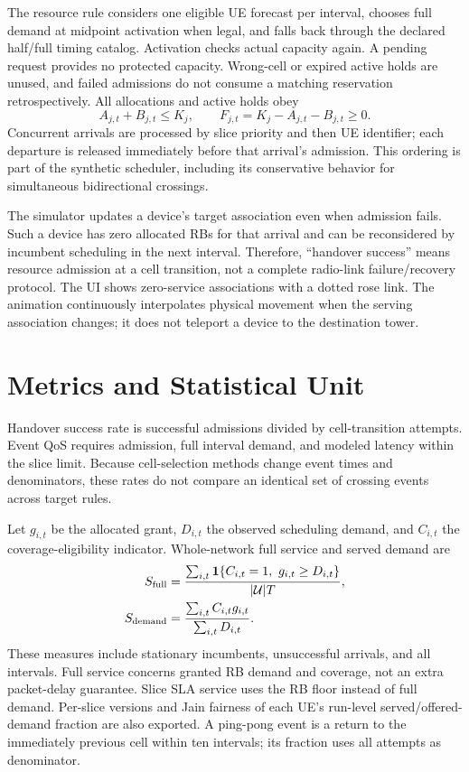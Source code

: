 \documentclass[journal]{IEEEtran}
\begin{document}
The resource rule considers one eligible UE forecast per interval, chooses full demand at midpoint activation when legal, and falls back through the declared half/full timing catalog. Activation checks actual capacity again. A pending request provides no protected capacity. Wrong-cell or expired active holds are unused, and failed admissions do not consume a matching reservation retrospectively. All allocations and active holds obey
\begin{equation}
A_{j,t}+B_{j,t}\le K_j,\qquad F_{j,t}=K_j-A_{j,t}-B_{j,t}\ge0.
\end{equation}
Concurrent arrivals are processed by slice priority and then UE identifier; each departure is released immediately before that arrival's admission. This ordering is part of the synthetic scheduler, including its conservative behavior for simultaneous bidirectional crossings.

The simulator updates a device's target association even when admission fails. Such a device has zero allocated RBs for that arrival and can be reconsidered by incumbent scheduling in the next interval. Therefore, ``handover success'' means resource admission at a cell transition, not a complete radio-link failure/recovery protocol. The UI shows zero-service associations with a dotted rose link. The animation continuously interpolates physical movement when the serving association changes; it does not teleport a device to the destination tower.

\section{Metrics and Statistical Unit}
Handover success rate is successful admissions divided by cell-transition attempts. Event QoS requires admission, full interval demand, and modeled latency within the slice limit. Because cell-selection methods change event times and denominators, these rates do not compare an identical set of crossing events across target rules.

Let $g_{i,t}$ be the allocated grant, $D_{i,t}$ the observed scheduling demand, and $C_{i,t}$ the coverage-eligibility indicator. Whole-network full service and served demand are
\begin{align}
S_{\rm full}&=\frac{\sum_{i,t}\mathbf1\{C_{i,t}=1,\ g_{i,t}\ge D_{i,t}\}}{|\mathcal U|T},\\
S_{\rm demand}&=\frac{\sum_{i,t}C_{i,t}g_{i,t}}{\sum_{i,t}D_{i,t}}.
\end{align}
These measures include stationary incumbents, unsuccessful arrivals, and all intervals. Full service concerns granted RB demand and coverage, not an extra packet-delay guarantee. Slice SLA service uses the RB floor instead of full demand. Per-slice versions and Jain fairness of each UE's run-level served/offered-demand fraction are also exported. A ping-pong event is a return to the immediately previous cell within ten intervals; its fraction uses all attempts as denominator.
\end{document}
